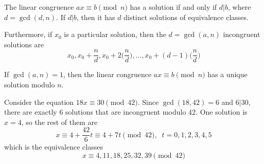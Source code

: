 \documentclass{article}
\newcounter{theorem}[section]
\newcounter{example}[section]
\begin{document}
\begin{theorem}
  \label{thm:solvability-of-a-linear-congruence}
The linear congruence $a x \equiv b \pmod{n}$ has a solution if and only if $d|b$, where $d = \gcd(d, n)$. If $d|b$, then it has $d$ distinct solutions of equivalence classes. 

Furthermore, if $x_0$ is a particular solution, then the $d = \gcd(a, n)$ incongruent solutions are
\begin{equation}
  x_0, x_0 + \frac{n}{d}, x_0 + 2 \Big( \frac{n}{d} \Big), ..., x_0 + (d-1) \Big( \frac{n}{d} \Big)
\end{equation}
\end{theorem}

\begin{corollary}
  \label{thm:unique-solution-of-a-coprime-linear-congruence}
If $\gcd(a, n) = 1$, then the linear congruence $a x \equiv b \pmod{n}$ has a unique solution modulo $n$. 
\end{corollary}

\begin{example}
  \label{ex:solving-a-linear-congruence-with-multiple}
Consider the equation $18 x \equiv 30 \pmod{42}$. Since $\gcd(18,42) = 6$ and $6 |30$, there are exactly $6$ solutions that are incongruent modulo $42$. One solution is $x = 4$, so the rest of them are 
\begin{equation}
  x \equiv 4 + \frac{42}{6} t \equiv 4 + 7t \pmod{42}, \;\; t = 0, 1, 2, 3, 4, 5
\end{equation}
which is the equivalence classes
\begin{equation}
  x \equiv 4, 11, 18, 25, 32, 39 \pmod{42}
\end{equation}
\end{example}
\end{document}
